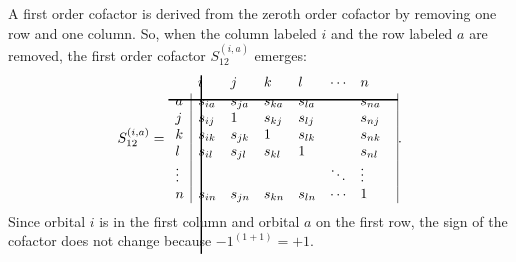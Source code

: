 A first order cofactor is derived from the zeroth order cofactor by removing one row and one column. So, when the column labeled $i$ and the row labeled $a$ are removed, the first order cofactor $S_{12}^{(i,a)}$ emerges:
\begin{equation}
S_{12}^{(i,a)} =
\begin{array}{lllllll}
 &  \hskip 2.0 pt \hbox{\lower 120pt\hbox{\vrule height128pt width 1.0pt}}\hskip-3.0pt i & j & k & l & \cdots & n \\
\noalign{\vskip-115pt}
 a &  \multicolumn{1}{|l}{s_{ia}} & s_{ja}  & s_{ka} & s_{la} & & \multicolumn{1}{l|}{ s_{na} } \\
\noalign{\vskip-8pt}
\multispan7\hbox{\vrule  height 1.0 pt width164pt}\cr
\noalign{\vskip 7pt}
  j & \multicolumn{1}{|l}{s_{ij}} & 1 & s_{kj} & s_{lj} & & \multicolumn{1}{l|}{s_{nj}} \\
 k & \multicolumn{1}{|l}{s_{ik}} & s_{jk} & 1 & s_{lk} & & \multicolumn{1}{l|}{s_{nk}} \\
 l & \multicolumn{1}{|l}{s_{il}} & s_{jl} & s_{kl} & 1 & & \multicolumn{1}{l|}{s_{nl}} \\
 \vdots & \multicolumn{1}{|l}{ } &   &   & & \ddots & \multicolumn{1}{l|}{\vdots} \\
 n & \multicolumn{1}{|l}{ s_{in}} & s_{jn} & s_{kn} & s_{ln} & \cdots & \multicolumn{1}{l|}{1}
\end{array}.\\
\label{ch2.eq.focofac}
\end{equation}
Since orbital $i$ is in the first column and orbital $a$ on the first row, the sign of the cofactor does not change because $-1^{(1+1)} = +1$.

